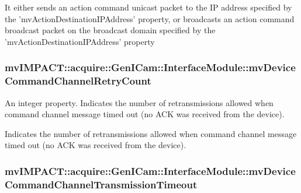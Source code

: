 It either sends an action command unicast packet to the I\+P address specified by the 'mv\+Action\+Destination\+I\+P\+Address' property, or broadcasts an action command broadcast packet on the broadcast domain specified by the 'mv\+Action\+Destination\+I\+P\+Address' property \hypertarget{classmv_i_m_p_a_c_t_1_1acquire_1_1_gen_i_cam_1_1_interface_module_aedcdf96599dc918cab683d9a9e915f64}{
\subsubsection[{mv\+Device\+Command\+Channel\+Retry\+Count}]{ mv\+I\+M\+P\+A\+C\+T\+::acquire\+::\+Gen\+I\+Cam\+::\+Interface\+Module\+::mv\+Device\+Command\+Channel\+Retry\+Count}}\label{classmv_i_m_p_a_c_t_1_1acquire_1_1_gen_i_cam_1_1_interface_module_aedcdf96599dc918cab683d9a9e915f64}


An integer property. Indicates the number of retransmissions allowed when command channel message timed out (no A\+C\+K was received from the device). 

Indicates the number of retransmissions allowed when command channel message timed out (no A\+C\+K was received from the device). \hypertarget{classmv_i_m_p_a_c_t_1_1acquire_1_1_gen_i_cam_1_1_interface_module_a66e495980177ae7627079146f5deafe3}{
\subsubsection[{mv\+Device\+Command\+Channel\+Transmission\+Timeout}]{ mv\+I\+M\+P\+A\+C\+T\+::acquire\+::\+Gen\+I\+Cam\+::\+Interface\+Module\+::mv\+Device\+Command\+Channel\+Transmission\+Timeout}}\label{classmv_i_m_p_a_c_t_1_1acquire_1_1_gen_i_cam_1_1_interface_module_a66e495980177ae7627079146f5deafe3}



